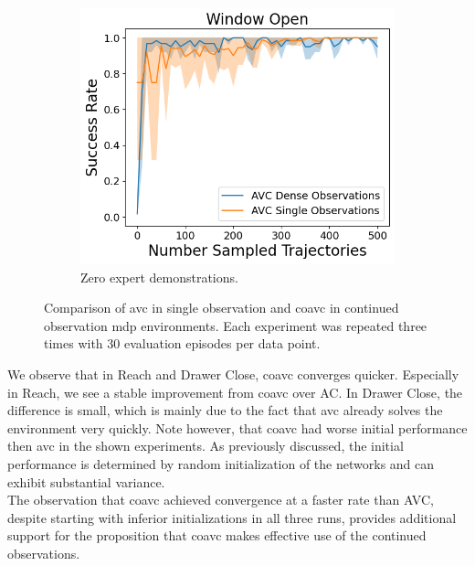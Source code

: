 \begin{figure}[htbp]
  \hfill
  \begin{subfigure}[t]{0.32\textwidth}
    \includegraphics[width=\textwidth]{images/dense_vs_sparse_0/Window Open.png}
    \caption{Zero expert demonstrations.}
  \end{subfigure}
  \caption{Comparison of \ac{avc} in single observation and \ac{coavc} in continued observation \ac{mdp} environments. Each experiment was repeated three times with 30 evaluation episodes per data point.
  }
  \label{fig:dense_vs_single}
\end{figure}

We observe that in Reach and Drawer Close, \ac{coavc} converges quicker. Especially in Reach, we see a stable improvement from \ac{coavc} over AC. In Drawer Close, the difference is 
small, which is mainly due to the fact that \ac{avc} already solves the environment very quickly. Note however, that \ac{coavc} had worse initial performance then \ac{avc} in the shown experiments. 
As previously discussed, the initial performance is determined by random initialization of the networks and can exhibit substantial 
variance.\\ 

The observation that \ac{coavc} achieved convergence at a faster rate than AVC, despite starting with inferior initializations in 
all three runs, provides additional support for the proposition that \ac{coavc} makes effective use of the continued observations. \\

